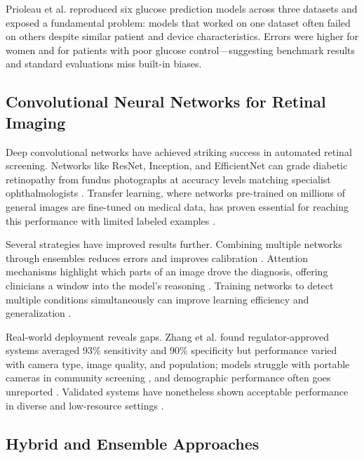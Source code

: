 Prioleau et al. \cite{prioleau2025deep} reproduced six glucose prediction models across three datasets and exposed a fundamental problem: models that worked on one dataset often failed on others despite similar patient and device characteristics. Errors were higher for women and for patients with poor glucose control—suggesting benchmark results and standard evaluations miss built-in biases.

\subsection{Convolutional Neural Networks for Retinal Imaging}

Deep convolutional networks have achieved striking success in automated retinal screening. Networks like ResNet, Inception, and EfficientNet can grade diabetic retinopathy from fundus photographs at accuracy levels matching specialist ophthalmologists \cite{zhu2021deep, zhang2025systematic}. Transfer learning, where networks pre-trained on millions of general images are fine-tuned on medical data, has proven essential for reaching this performance with limited labeled examples \cite{zhu2021deep}.

Several strategies have improved results further. Combining multiple networks through ensembles reduces errors and improves calibration \cite{selvachandran2022developments}. Attention mechanisms highlight which parts of an image drove the diagnosis, offering clinicians a window into the model's reasoning \cite{zhu2021deep, bhati2024interpretable}. Training networks to detect multiple conditions simultaneously can improve learning efficiency and generalization \cite{selvachandran2022developments}.

Real-world deployment reveals gaps. Zhang et al. \cite{zhang2025systematic} found regulator-approved systems averaged 93\% sensitivity and 90\% specificity but performance varied with camera type, image quality, and population; models struggle with portable cameras in community screening \cite{raj2024federated}, and demographic performance often goes unreported \cite{wang2024ai, olusanya2024mitigating}. Validated systems have nonetheless shown acceptable performance in diverse and low-resource settings \cite{phene2019artificial, wolf2024access, boucher2024implementation}.

\subsection{Hybrid and Ensemble Approaches}

